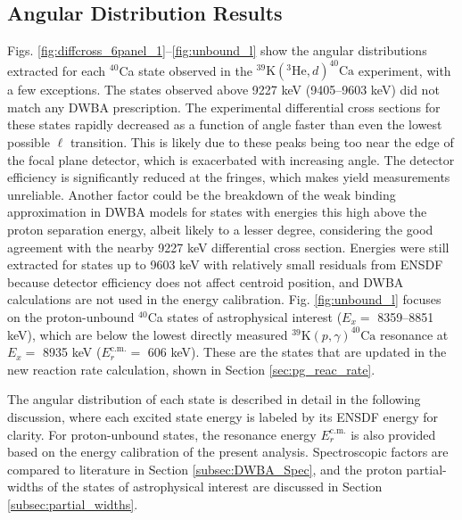 \subsection{Angular Distribution Results}

Figs. \ref{fig:diffcross_6panel_1}--\ref{fig:unbound_l} show the angular distributions extracted for each $^{40}$Ca state observed in the $^{39}\mathrm{K}(^{3}\mathrm{He}, d)^{40}\mathrm{Ca}$ experiment, with a few exceptions. The states observed above 9227 keV (9405--9603 keV) did not match any DWBA prescription. The experimental differential cross sections for these states rapidly decreased as a function of angle faster than even the lowest possible $\ell$ transition. This is likely due to these peaks being too near the edge of the focal plane detector, which is exacerbated with increasing angle. The detector efficiency is significantly reduced at the fringes, which makes yield measurements unreliable. Another factor could be the breakdown of the weak binding approximation in DWBA models for states with energies this high above the proton separation energy, albeit likely to a lesser degree, considering the good agreement with the nearby 9227 keV differential cross section. Energies were still extracted for states up to 9603 keV with relatively small residuals from ENSDF \cite{Chen2017} because detector efficiency does not affect centroid position, and DWBA calculations are not used in the energy calibration. Fig. \ref{fig:unbound_l} focuses on the proton-unbound $^{40}$Ca states of astrophysical interest ($E_{x} =$ 8359--8851 keV), which are below the lowest directly measured $^{39}\mathrm{K}(p, \gamma)^{40}\mathrm{Ca}$ resonance at $E_{x} =$ 8935 keV ($E_{r}^{\mathrm{c.m.}} =$ 606 keV). These are the states that are updated in the new reaction rate calculation, shown in Section \ref{sec:pg_reac_rate}. 

The angular distribution of each state is described in detail in the following discussion, where each excited state energy is labeled by its ENSDF \cite{Chen2017} energy for clarity. For proton-unbound states, the resonance energy $E_{r}^{\mathrm{c.m.}}$ is also provided based on the energy calibration of the present analysis. Spectroscopic factors are compared to literature in Section \ref{subsec:DWBA_Spec}, and the proton partial-widths of the states of astrophysical interest are discussed in Section \ref{subsec:partial_widths}.

\newpage

